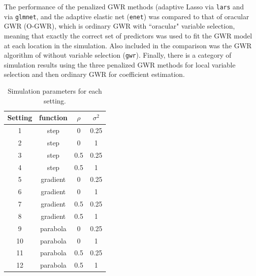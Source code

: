 \documentclass[authoryear, review, 11pt]{elsarticle}
\begin{document}
	The performance of the penalized GWR methods (adaptive Lasso via \verb!lars! and via \verb!glmnet!, and the adaptive elastic net (\verb!enet!) was compared to that of oracular GWR (O-GWR), which is ordinary GWR with ``oracular" variable selection, meaning that exactly the correct set of predictors was used to fit the GWR model at each location in the simulation. Also included in the comparison was the GWR algorithm of \cite{Fotheringham:2002} without variable selection (\verb!gwr!). Finally, there is a category of simulation results using the three penalized GWR methods for local variable selection and then ordinary GWR for coefficient estimation.\\
	
\begin{table}[h!]
	\begin{center}
	\begin{tabular}{cccc}
		\hline
		Setting & function & $\rho$ & $\sigma^2$ \\ 
		\hline
		1 & step & 0 & 0.25 \\ 
		2 & step & 0 & 1 \\ 
		3 & step & 0.5 & 0.25 \\ 
		4 & step & 0.5 & 1 \\ 
		\hline
		5 & gradient & 0 & 0.25 \\ 
		6 & gradient & 0 & 1 \\ 
		7 & gradient & 0.5 & 0.25 \\ 
		8 & gradient & 0.5 & 1 \\ 
		\hline
		9 & parabola & 0 & 0.25 \\ 
		10 & parabola & 0 & 1 \\ 
		11 & parabola & 0.5 & 0.25 \\ 
		12 & parabola & 0.5 & 1 
	\end{tabular}
	\end{center}
	\caption{Simulation parameters for each setting.\label{table:simulation_settings}}
\end{table}
\end{document}

